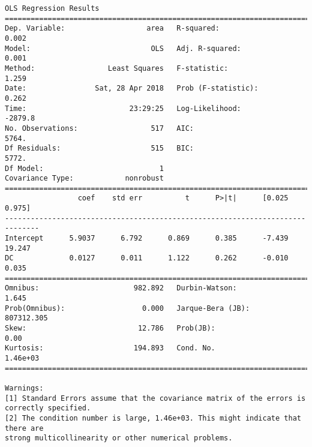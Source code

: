 \documentclass[11pt]{article}
\begin{document}
\begin{Verbatim}[commandchars=\\\{\}]
                            OLS Regression Results                            
==============================================================================
Dep. Variable:                   area   R-squared:                       0.002
Model:                            OLS   Adj. R-squared:                  0.001
Method:                 Least Squares   F-statistic:                     1.259
Date:                Sat, 28 Apr 2018   Prob (F-statistic):              0.262
Time:                        23:29:25   Log-Likelihood:                -2879.8
No. Observations:                 517   AIC:                             5764.
Df Residuals:                     515   BIC:                             5772.
Df Model:                           1                                         
Covariance Type:            nonrobust                                         
==============================================================================
                 coef    std err          t      P>|t|      [0.025      0.975]
------------------------------------------------------------------------------
Intercept      5.9037      6.792      0.869      0.385      -7.439      19.247
DC             0.0127      0.011      1.122      0.262      -0.010       0.035
==============================================================================
Omnibus:                      982.892   Durbin-Watson:                   1.645
Prob(Omnibus):                  0.000   Jarque-Bera (JB):           807312.305
Skew:                          12.786   Prob(JB):                         0.00
Kurtosis:                     194.893   Cond. No.                     1.46e+03
==============================================================================

Warnings:
[1] Standard Errors assume that the covariance matrix of the errors is correctly specified.
[2] The condition number is large, 1.46e+03. This might indicate that there are
strong multicollinearity or other numerical problems.



\end{Verbatim}
\end{document}
